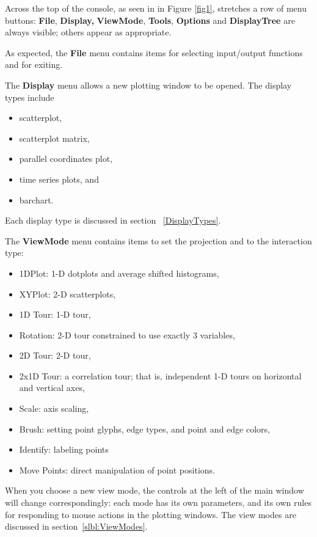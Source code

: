 \documentclass[11pt]{article}
\begin{document}
Across the top of the console, as seen in in Figure \ref{fig1},
stretches a row of menu buttons:  {\bf File}, {\bf Display,} {\bf
ViewMode}, {\bf Tools}, {\bf Options} and {\bf DisplayTree} are
always visible; others appear as appropriate.

As expected, the {\bf File} menu contains items for selecting
input/output functions and for exiting.

The {\bf Display} menu allows a new plotting window to be opened. 
The display types include
\begin{itemize}
\itemsep 0em
\item scatterplot,
\item scatterplot matrix, 
\item parallel coordinates plot, 
\item time series plots, and
\item barchart.
\end{itemize}

Each display type
is discussed in section ~\ref{DisplayTypes}.

The {\bf ViewMode} menu contains items to set the projection 
and to the interaction type:
\begin{itemize}
\itemsep 0em
\item 1DPlot: 1-D dotplots and average shifted histograms,
\item XYPlot: 2-D scatterplots,
\item 1D Tour: 1-D tour,
\item Rotation: 2-D tour constrained to use exactly 3 variables,
\item 2D Tour: 2-D tour,
\item 2x1D Tour: a correlation tour; that is, independent 1-D tours on
      horizontal and vertical axes,
\item Scale: axis scaling,
\item Brush: setting point glyphs, edge types, and point and edge colors,
\item Identify: labeling points
\item Move Points: direct manipulation of point positions.
\end{itemize}

When you choose a new view mode, the controls at the left of the main
window will change correspondingly:  each mode has its own
parameters, and its own rules for responding to mouse actions in the
plotting windows.  The view modes are discussed in
section~\ref{slbl:ViewModes}.
\end{document}
